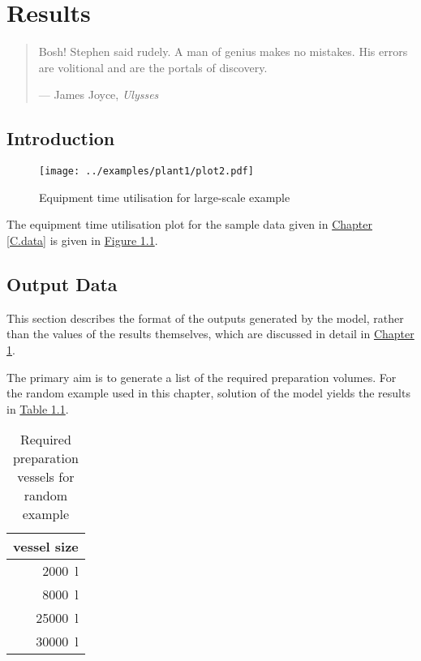 %
%
%
%

\chapter{Results}\label{C.results}

\begin{quote}
Bosh! Stephen said rudely.
A man of genius makes no mistakes.
His errors are volitional and are the portals of discovery.

\hspace{2cm}--- James Joyce, \emph{Ulysses}
\end{quote}

\section{Introduction}\label{S.intro5}
\begin{figure}
    \centering
    \texttt{[image: ../examples/plant1/plot2.pdf]}
    \caption{Equipment time utilisation for large-scale example}
    \label{fig.etu}
\end{figure}
The equipment time utilisation plot for the sample data given in 
\hyperref[C.data]{Chapter \ref*{C.data}} is given in
\hyperref[fig.etu]{Figure \ref*{fig.etu}}.

\section{Output Data}\label{S.outputdata}

This section describes the format of the outputs generated by the model, rather
than the values of the results themselves, which are discussed in detail in 
\hyperref[C.results]{Chapter \ref*{C.results}}.

The primary aim is to generate a list of the required preparation volumes.
For the random example used in this chapter, solution of the model yields
the results in \hyperref[tbl.reqvessels]{Table \ref*{tbl.reqvessels}}.

\begin{table}[h!]
    \centering
    \caption{Required preparation vessels for random example}
    \label{tbl.reqvessels}
    \begin{tabular}{r}
        vessel size\\ \hline
        \SI{2000}{\litre}\\
        \SI{8000}{\litre}\\
        \SI{25000}{\litre}\\
        \SI{30000}{\litre}\\
    \end{tabular}
\end{table}

